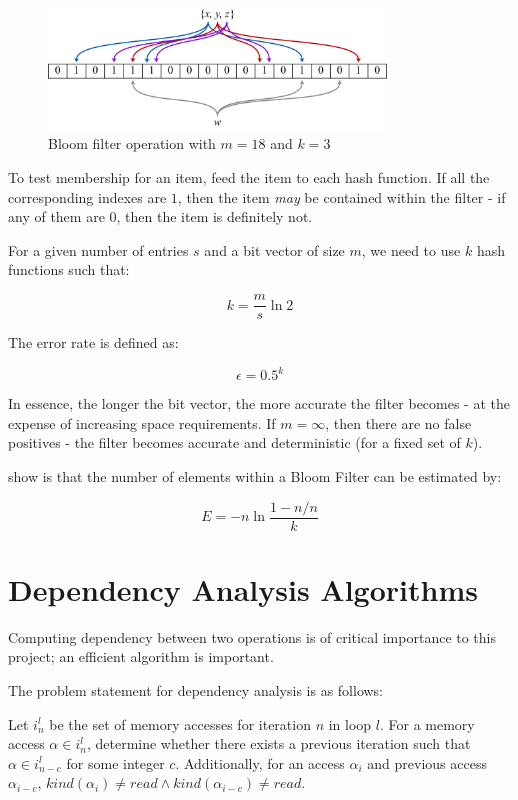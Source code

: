 		\begin{figure}[h!]
				\centering
				\includegraphics[width=0.8\textwidth]{graphics/bloomfilter.pdf}
				\caption{Bloom filter operation with $m=18$ and $k=3$}
				\label{fig:bloom-filter}
		\end{figure}
			
		To test membership for an item, feed the item to each hash function. If all the corresponding indexes are $1$, then the item \emph{may} be contained within the filter - if any of them are $0$, then the item is definitely not.
		
		For a given number of entries $s$ and a bit vector of size $m$, we need to use $k$ hash functions such that:
		
		\[
		k = \frac{m}{s} \ln 2
		\]
		
		The error rate is defined as:
		
		\[
		\epsilon = 0.5^k
		\]
		
		In essence, the longer the bit vector, the more accurate the filter becomes - at the expense of increasing space requirements. If $m=\infty$, then there are no false positives - the filter becomes accurate and deterministic (for a fixed set of $k$).
		
		\citet{Swamidass2007} show is that the number of elements within a Bloom Filter can be estimated by:
		
		\[
		E = -n \ln \frac{1-n/n}{k}
		\]

\section{Dependency Analysis Algorithms} \label{sec:runtime/analysis}
	Computing dependency between two operations is of critical importance to this project; an efficient algorithm is important.
	
	The problem statement for dependency analysis is as follows:
	
	Let $i^l_n$ be the set of memory accesses for iteration $n$ in loop $l$. For a memory access $\alpha \in i^l_n$, determine whether there exists a previous iteration such that $\alpha \in i^l_{n-c}$ for some integer $c$. Additionally, for an access $\alpha_i$ and previous access $\alpha_{i-c}$, $kind(\alpha_i) \neq read \wedge kind(\alpha_{i-c}) \neq read$.

